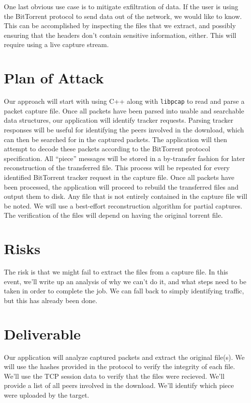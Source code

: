 \documentclass[11pt]{article}
\begin{document}
One last obvious use case is to mitigate exfiltration of data.  If the user is
using the BitTorrent protocol to send data out of the network, we would like to
know.  This can be accomplished by inspecting the files that we extract, and
possibly ensuring that the headers don't contain sensitive information, either.
This will require using a live capture stream.

\section{Plan of Attack}
Our approach will start with using C++ along with \verb=libpcap= to read and
parse a packet capture file. Once all packets have been parsed into usable and
searchable data structures, our application will identify tracker
requests. Parsing tracker responses will be useful for identifying the peers
involved in the download, which can then be searched for in the captured
packets. The application will then attempt to decode these packets according to
the BitTorrent protocol specification. All ``piece'' messages will be stored in
a by-transfer fashion for later reconstruction of the transferred file. This
process will be repeated for every identified BitTorrent tracker request in the
capture file. Once all packets have been processed, the application will proceed
to rebuild the transferred files and output them to disk. Any file that is not
entirely contained in the capture file will be noted.  We will use a best-effort
reconstruction algorithm for partial captures.  The verification of the files
will depend on having the original torrent file.

\section{Risks}
The risk is that we might fail to extract the files from a capture file.  In
this event, we'll write up an analysis of why we can't do it, and what steps
need to be taken in order to complete the job.  We can fall back to simply
identifying traffic, but this has already been done.

\section{Deliverable}
Our application will analyze captured packets and extract the original file(s).
We will use the hashes provided in the protocol to verify the integrity of each
file.  We'll use the TCP session data to verify that the files were recieved.
We'll provide a list of all peers involved in the download.  We'll identify
which piece were uploaded by the target.
\end{document}
